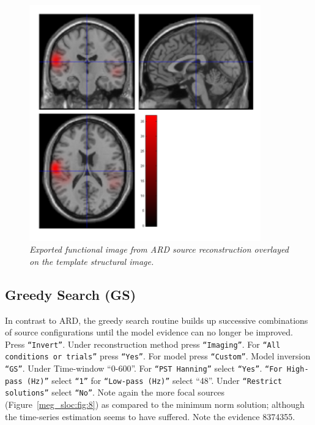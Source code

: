 \begin{figure}
\begin{center}
\includegraphics[width=100mm]{meg_sloc/Slide7}
\caption{\em Exported functional image from ARD source reconstruction overlayed on the template structural image.\label{meg_sloc:fig:7}}
\end{center}
\end{figure}


\subsection{Greedy Search (GS)}
In contrast to ARD, the greedy search routine builds up successive combinations of source configurations until the model evidence can no longer be improved.
Press \texttt{``Invert''}. Under reconstruction method press \texttt{``Imaging''}. For \texttt{``All conditions or trials''} press \texttt{``Yes''}. For model press \texttt{``Custom''}. Model inversion \texttt{``GS''}. Under Time-window ``0-600''. For \texttt{``PST Hanning''} select \texttt{``Yes''}. \texttt{``For High-pass (Hz)''} select \texttt{``1''} for \texttt{``Low-pass (Hz)''} select ``48''. Under \texttt{``Restrict solutions''} select \texttt{``No''}.  Note again the more focal sources (Figure~\ref{meg_sloc:fig:8}) as compared to the minimum norm solution; although the time-series estimation seems to have suffered. Note the evidence 8374355.

